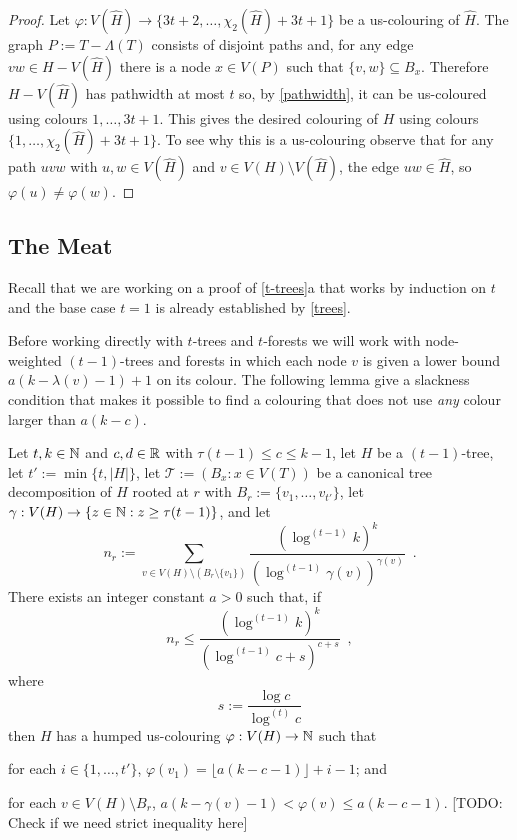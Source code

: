 \documentclass[kpfonts]{patmorin}
\newcommand{\uqs}{\chi_2}
\theoremstyle{named}
\newcommand{\weirdref}[2]{\cref{#1}#2}
\begin{document}
\begin{proof}
    Let $\varphi:V(\hat{H})\to \{3t+2,\ldots,\uqs(\hat{H})+3t+1\}$ be a us-colouring of $\hat{H}$. The graph $P:=T-\Lambda(T)$ consists of disjoint paths and, for any edge $vw\in H-V(\hat{H})$ there is a node $x\in V(P)$ such that $\{v,w\}\subseteq B_x$.  Therefore $H-V(\hat{H})$ has pathwidth at most $t$ so, by \cref{pathwidth}, it can be us-coloured using colours $1,\ldots,3t+1$.  This gives the desired colouring of $H$ using colours $\{1,\ldots,\uqs(\hat{H})+3t+1\}$.  To see why this is a us-colouring observe that for any path $uvw$ with $u,w\in V(\hat{H})$ and $v\in V(H)\setminus V(\hat{H})$, the edge $uw\in\hat{H}$, so $\varphi(u)\neq\varphi(w)$.
\end{proof}

\subsection{The Meat}

Recall that we are working on a proof of \weirdref{t-trees}{a} that works by induction on $t$ and the base case $t=1$ is already established by \cref{trees}.

Before working directly with $t$-trees and $t$-forests we will work with node-weighted $(t-1)$-trees and forests in which each node $v$ is given a lower bound $a(k-\lambda(v)-1)+1$ on its colour. The following lemma give a slackness condition that makes it possible to find a colouring that does not use \emph{any} colour larger than $a(k-c)$.

\begin{lem}\label{t-tree-slack}
Let $t,k\in\mathbb{N}$ and $c,d\in\mathbb{R}$  with $\tau(t-1)\le c\le k-1$, let $H$ be a $(t-1)$-tree, let $t':=\min\{t,|H|\}$, let $\mathcal{T}:=(B_x:x\in V(T))$ be a canonical tree decomposition of $H$ rooted at $r$ with $B_r:=\{v_1,\ldots,v_{t'}\}$, let $\gamma:V(H)\to\{z\in\mathbb{N}: z\ge \tau(t-1)\}$, and let
\[
    n_r:=\sum_{v\in V(H)\setminus (B_r\setminus\{v_1\})} \frac{(\log^{(t-1)} k)^k}{(\log^{(t-1)} \gamma(v))^{\gamma(v)}} \enspace .
\]
There exists an integer constant $a>0$ such that,
if
\begin{equation}
     n_r \le \frac{(\log^{(t-1)} k)^k}{(\log^{(t-1)} c + s)^{c+s}} \enspace ,
 \label{total-weight-i}
\end{equation}
where
\[
    s := \frac{\log c}{\log^{(t)} c}
\]
then $H$ has a humped us-colouring $\varphi:V(H)\to\mathbb{N}$ such that
\begin{compactenum}[(P1)]
    \item for each $i\in\{1,\ldots,{t'}\}$, $\varphi(v_1)=\lfloor a(k-c-1)\rfloor+i-1$; and
    \item for each $v\in V(H)\setminus B_r$, $a(k-\gamma(v)-1) < \varphi(v) \le a(k-c-1)$.  [TODO: Check if we need strict inequality here]
\end{compactenum}
\end{lem}
\end{document}
